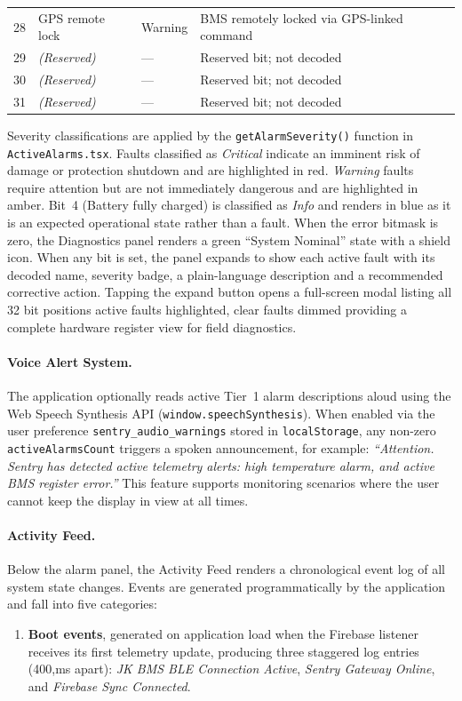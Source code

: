 \documentclass[12pt, a4paper]{report}
\begin{document}
{\begin{longtable}{C{1.2cm} L{5.0cm} C{2.0cm} L{4.5cm}}
28 & GPS remote lock          & Warning  & BMS remotely locked via GPS-linked command \\
29 & \textit{(Reserved)}      & ---      & Reserved bit; not decoded \\
30 & \textit{(Reserved)}      & ---      & Reserved bit; not decoded \\
31 & \textit{(Reserved)}      & ---      & Reserved bit; not decoded \\
\end{longtable}
Severity classifications are applied by the \texttt{getAlarmSeverity()}
function in \texttt{ActiveAlarms.tsx}. Faults classified as \emph{Critical}
indicate an imminent risk of damage or protection shutdown and are
highlighted in red. \emph{Warning} faults require attention but are not
immediately dangerous and are highlighted in amber. Bit~4
(Battery fully charged) is classified as \emph{Info} and renders in blue
as it is an expected operational state rather than a fault.
When the error bitmask is zero, the Diagnostics panel renders a green
``System Nominal'' state with a shield icon. When any bit is set, the
panel expands to show each active fault with its decoded name, severity
badge, a plain-language description and a recommended corrective action.
Tapping the expand button opens a full-screen modal listing all 32 bit
positions  active faults highlighted, clear faults dimmed  providing
a complete hardware register view for field diagnostics.
\paragraph{Voice Alert System.}
The application optionally reads active Tier~1 alarm descriptions aloud
using the Web Speech Synthesis API (\texttt{window.speechSynthesis}).
When enabled via the user preference \texttt{sentry\_audio\_warnings}
stored in \texttt{localStorage}, any non-zero \texttt{activeAlarmsCount}
triggers a spoken announcement, for example:
\textit{``Attention. Sentry has detected active telemetry alerts: high
temperature alarm, and active BMS register error.''} This feature
supports monitoring scenarios where the user cannot keep the display
in view at all times.
\paragraph{Activity Feed.}
Below the alarm panel, the Activity Feed renders a chronological event
log of all system state changes. Events are generated programmatically
by the application and fall into five categories:
\begin{enumerate}
\item \textbf{Boot events}, generated on application load when the
Firebase listener receives its first telemetry update, producing three
staggered log entries (400,ms apart): \textit{JK BMS BLE Connection
Active}, \textit{Sentry Gateway Online}, and \textit{Firebase Sync
Connected}.


\end{enumerate}}
\end{document}
